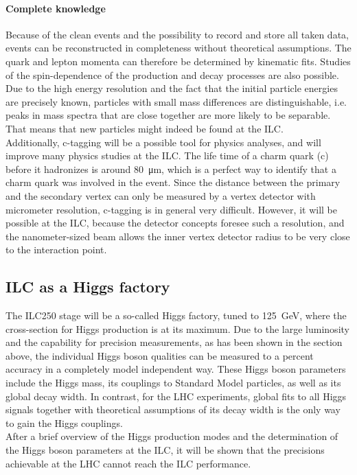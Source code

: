 \paragraph{Complete knowledge}
Because of the clean events and the possibility to record and store all taken data, events can be reconstructed in completeness without theoretical assumptions.
The quark and lepton momenta can therefore be determined by kinematic fits.
Studies of the spin-dependence of the production and decay processes are also possible.\\
Due to the high energy resolution and the fact that the initial particle energies are precisely known, particles with small mass differences are distinguishable, i.e. peaks in mass spectra that are close together are more likely to be separable.
That means that new particles might indeed be found at the ILC.\\
Additionally, c-tagging will be a possible tool for physics analyses, and will improve many physics studies at the ILC.
The life time of a charm quark (c) before it hadronizes is around \SI{80}{\micro\meter}, which is a perfect way to identify that a charm quark was involved in the event.
Since the distance between the primary and the secondary vertex can only be measured by a vertex detector with micrometer resolution, c-tagging is in general very difficult.
However, it will be possible at the ILC, because the detector concepts foresee such a resolution, and the nanometer-sized beam allows the inner vertex detector radius to be very close to the interaction point. 

\subsection{ILC as a Higgs factory}
The ILC250 stage will be a so-called Higgs factory, tuned to \SI{125}{\GeV}, where the cross-section for Higgs production is at its maximum.
Due to the large luminosity and the capability for precision measurements, as has been shown in the section above, the individual Higgs boson qualities can be measured to a percent accuracy in a completely model independent way.
These Higgs boson parameters include the Higgs mass, its couplings to Standard Model particles, as well as its global decay width.
In contrast, for the LHC experiments, global fits to all Higgs signals together with theoretical assumptions of its decay width is the only way to gain the Higgs couplings.
\\After a brief overview of the Higgs production modes and the determination of the Higgs boson parameters at the ILC, it will be shown that the precisions achievable at the LHC cannot reach the ILC performance.

